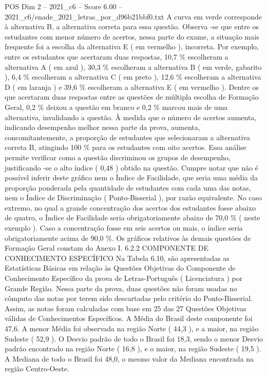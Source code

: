 \begin{textsample}{POS Dim 2 – 2021\_c6 – Score 6.00 – 2021\_c6/enade\_2021\_letras\_por\_d96b21bbf0.txt}
A curva em verde corresponde à alternativa B, a alternativa correta para essa questão.
Observa -se que entre os estudantes com menor número de acertos, nessa parte do exame, a situação mais frequente foi a escolha da alternativa E ( em vermelho ), incorreta.
Por exemplo, entre os estudantes que acertaram duas respostas, 10,7 \% escolheram a alternativa A ( em azul ), 30,3 \% escolheram a alternativa B ( em verde, gabarito ), 6,4 \% escolheram a alternativa C ( em preto ), 12,6 \% escolheram a alternativa D ( em laranja ) e 39,6 \% escolheram a alternativa E ( em vermelho ).
Dentre os que acertaram duas respostas entre as questões de múltipla escolha de Formação Geral, 0,2 \% deixou a questão em branco e 0,2 \% marcou mais de uma alternativa, invalidando a questão.
À medida que o número de acertos aumenta, indicando desempenho melhor nessa parte da prova, aumenta, concomitantemente, a proporção de estudantes que selecionaram a alternativa correta B, atingindo 100 \% para os estudantes com oito acertos.
Essa análise permite verificar como a questão discriminou os grupos de desempenho, justificando -se o alto índice ( 0,48 ) obtido na questão.
Cumpre notar que não é possível inferir deste gráfico nem o Índice de Facilidade, que seria uma média da proporção ponderada pela quantidade de estudantes com cada uma das notas, nem o Índice de Discriminação ( Ponto-Bisserial ), por razão equivalente.
No caso extremo, no qual a grande concentração dos acertos dos estudantes fosse abaixo de quatro, o Índice de Facilidade seria obrigatoriamente abaixo de 70,0 \% ( neste exemplo ).
Caso a concentração fosse em seis acertos ou mais, o índice seria obrigatoriamente acima de 90,0 \%.
Os gráficos relativos às demais questões de Formação Geral constam do Anexo I. 6.2.2 COMPONENTE DE CONHECIMENTO ESPECÍFICO Na Tabela 6.10, são apresentadas as Estatísticas Básicas em relação às Questões Objetivas do Componente de Conhecimento Específico da prova de Letras-Português ( Licenciatura ) por Grande Região.
Nessa parte da prova, duas questões não foram usadas no cômputo das notas por terem sido descartadas pelo critério do Ponto-Bisserial.
Assim, as notas foram calculadas com base em 25 das 27 Questões Objetivas válidas de Conhecimentos Específicos.
A Média do Brasil deste componente foi 47,6.
A menor Média foi observada na região Norte ( 44,3 ), e a maior, na região Sudeste ( 52,9 ).
O Desvio padrão de todo o Brasil foi 18,3, sendo o menor Desvio padrão encontrado na região Norte ( 16,8 ), e o maior, na região Sudeste ( 19,5 ).
A Mediana de todo o Brasil foi 48,0, o mesmo valor da Mediana encontrada na região Centro-Oeste.

\end{textsample}
